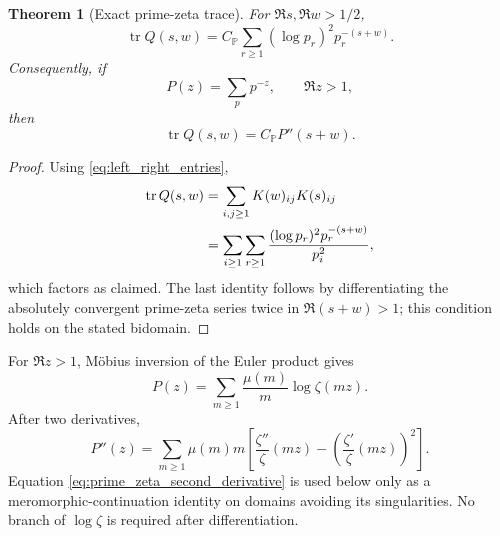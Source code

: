 \documentclass[11pt]{amsart}
\numberwithin{equation}{section}
\theoremstyle{plain}
\newtheorem{theorem}{Theorem}[section]
\theoremstyle{definition}
\theoremstyle{remark}
\newcommand{\tr}{\operatorname{tr}}
\begin{document}
\begin{theorem}[Exact prime-zeta trace]
\label{thm:prime_zeta_trace}
For $\Re s,\Re w>1/2$,
\begin{equation}
\tr Q(s,w)
=C_{\mathbb P}\sum_{r\ge1}(\log p_r)^2p_r^{-(s+w)}.
\label{eq:Q_trace_prime_sum}
\end{equation}
Consequently, if
\begin{equation}
P(z)=\sum_p p^{-z},\qquad \Re z>1,
\label{eq:prime_zeta_definition}
\end{equation}
then
\begin{equation}
\boxed{\ \tr Q(s,w)=C_{\mathbb P}P''(s+w).\ }
\label{eq:Q_trace_P_second}
\end{equation}
\end{theorem}

\begin{proof}
Using \eqref{eq:left_right_entries},
\begin{align}
\tr Q(s,w)
&=\sum_{i,j\ge1}K(w)_{ij}K(s)_{ij}\notag\\
&=\sum_{i\ge1}\sum_{r\ge1}
\frac{(\log p_r)^2p_r^{-(s+w)}}{p_i^2},
\label{eq:Q_trace_calculation}
\end{align}
which factors as claimed.  The last identity follows by differentiating the absolutely convergent prime-zeta series twice in $\Re(s+w)>1$; this condition holds on the stated bidomain.
\end{proof}

For $\Re z>1$, M\"obius inversion of the Euler product gives
\begin{equation}
P(z)=\sum_{m\ge1}\frac{\mu(m)}{m}\log\zeta(mz).
\label{eq:prime_zeta_mobius_inversion}
\end{equation}
After two derivatives,
\begin{equation}
P''(z)=
\sum_{m\ge1}\mu(m)m
\left[
\frac{\zeta''}{\zeta}(mz)
-\left(\frac{\zeta'}{\zeta}(mz)\right)^2
\right].
\label{eq:prime_zeta_second_derivative}
\end{equation}
Equation \eqref{eq:prime_zeta_second_derivative} is used below only as a meromorphic-continuation identity on domains avoiding its singularities.  No branch of $\log\zeta$ is required after differentiation.
\end{document}
